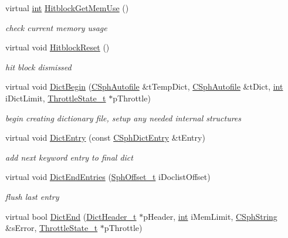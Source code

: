\begin{DoxyCompactItemize}
virtual \hyperlink{sphinxexpr_8cpp_a4a26e8f9cb8b736e0c4cbf4d16de985e}{int} \hyperlink{classCSphDict_a0c4ed1170b00eb24cf0fe54c3cf75f0c}{Hitblock\-Get\-Mem\-Use} ()
\begin{DoxyCompactList}\small\item\em check current memory usage \end{DoxyCompactList}\item 
virtual void \hyperlink{classCSphDict_ac85eac348bb27851c0c00c8fc659e5b7}{Hitblock\-Reset} ()
\begin{DoxyCompactList}\small\item\em hit block dismissed \end{DoxyCompactList}\item 
virtual void \hyperlink{classCSphDict_acbc0935ebde0242f8dd6daffaf72beb3}{Dict\-Begin} (\hyperlink{classCSphAutofile}{C\-Sph\-Autofile} \&t\-Temp\-Dict, \hyperlink{classCSphAutofile}{C\-Sph\-Autofile} \&t\-Dict, \hyperlink{sphinxexpr_8cpp_a4a26e8f9cb8b736e0c4cbf4d16de985e}{int} i\-Dict\-Limit, \hyperlink{structThrottleState__t}{Throttle\-State\-\_\-t} $\ast$p\-Throttle)
\begin{DoxyCompactList}\small\item\em begin creating dictionary file, setup any needed internal structures \end{DoxyCompactList}\item 
virtual void \hyperlink{classCSphDict_a82a05e4d4e075166fc1f1942af9b2a61}{Dict\-Entry} (const \hyperlink{structCSphDictEntry}{C\-Sph\-Dict\-Entry} \&t\-Entry)
\begin{DoxyCompactList}\small\item\em add next keyword entry to final dict \end{DoxyCompactList}\item 
virtual void \hyperlink{classCSphDict_ac5e6881b6942c3ba27d5d8d9d8505a2f}{Dict\-End\-Entries} (\hyperlink{sphinx_8h_a0fb3b64afebef33c61367714754eaa90}{Sph\-Offset\-\_\-t} i\-Doclist\-Offset)
\begin{DoxyCompactList}\small\item\em flush last entry \end{DoxyCompactList}\item 
virtual bool \hyperlink{classCSphDict_a33ed99b9fd18682b5d6dfd72a05608f6}{Dict\-End} (\hyperlink{structDictHeader__t}{Dict\-Header\-\_\-t} $\ast$p\-Header, \hyperlink{sphinxexpr_8cpp_a4a26e8f9cb8b736e0c4cbf4d16de985e}{int} i\-Mem\-Limit, \hyperlink{structCSphString}{C\-Sph\-String} \&s\-Error, \hyperlink{structThrottleState__t}{Throttle\-State\-\_\-t} $\ast$p\-Throttle)

\end{DoxyCompactItemize}
